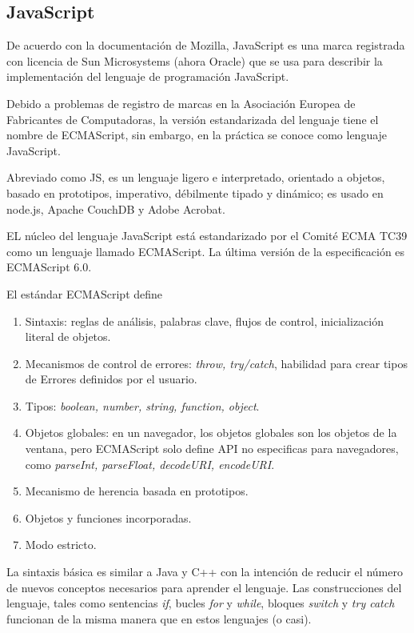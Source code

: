 \subsection*{JavaScript}

De acuerdo con la documentación de Mozilla\cite{noauthor_javascript_nodate}, JavaScript es una marca registrada con licencia de Sun Microsystems (ahora Oracle) que se usa para describir la implementación del lenguaje de programación JavaScript.


Debido a problemas de registro de marcas en la Asociación Europea de Fabricantes de Computadoras, la versión estandarizada del lenguaje tiene el nombre de ECMAScript, sin embargo, en la práctica se conoce como lenguaje JavaScript. 


Abreviado como JS, es un lenguaje ligero e interpretado, orientado a objetos, basado en prototipos, imperativo, débilmente tipado y dinámico; es usado en node.js, Apache CouchDB y Adobe Acrobat.


EL núcleo del lenguaje JavaScript está estandarizado por el Comité ECMA TC39 como un lenguaje llamado ECMAScript. La última versión de la especificación es ECMAScript 6.0.


El estándar ECMAScript define 

\begin{enumerate}
    \item Sintaxis: reglas de análisis, palabras clave, flujos de control, inicialización literal de objetos.
    \item Mecanismos de control de errores: \textit{throw, try/catch}, habilidad para crear tipos de Errores definidos por el usuario.
    \item Tipos: \textit{boolean, number, string, function, object}.
    \item  Objetos globales: en un navegador, los objetos globales son los objetos de la ventana, pero ECMAScript solo define API no especificas para navegadores, como \textit{parseInt, parseFloat, decodeURI, encodeURI}.
    \item Mecanismo de herencia basada en prototipos.
    \item Objetos y funciones incorporadas.
    \item Modo estricto.
\end{enumerate}

La sintaxis básica es similar a Java y C++ con la intención de reducir el número de nuevos conceptos necesarios para aprender el lenguaje. Las construcciones del lenguaje, tales como sentencias \textit{if}, bucles \textit{for} y \textit{while}, bloques \textit{switch} y \textit{try catch} funcionan de la misma manera que en estos lenguajes (o casi).

